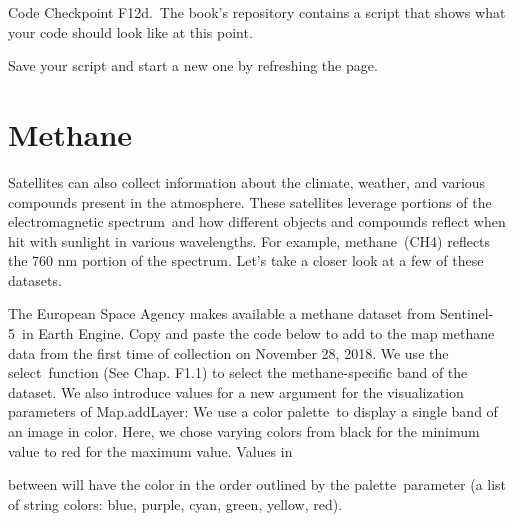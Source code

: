 \documentclass[
  letterpaper,
  DIV=11,
  numbers=noendperiod]{scrreprt}
\begin{document}
\begin{tcolorbox}[enhanced jigsaw, left=2mm, breakable, rightrule=.15mm, opacityback=0, colframe=quarto-callout-note-color-frame, colbacktitle=quarto-callout-note-color!10!white, arc=.35mm, opacitybacktitle=0.6, toptitle=1mm, colback=white, leftrule=.75mm, title=\textcolor{quarto-callout-note-color}{\faInfo}\hspace{0.5em}{Note}, toprule=.15mm, bottomtitle=1mm, titlerule=0mm, bottomrule=.15mm, coltitle=black]

Code Checkpoint F12d.~The book's repository contains a script that shows
what your code should look like at this point.

\end{tcolorbox}

Save your script and start a new one by refreshing the page.

\hypertarget{methane}{%
\section{Methane}\label{methane}}

Satellites can also collect information about the climate, weather, and
various compounds present in the atmosphere. These satellites leverage
portions of the electromagnetic spectrum~and how different objects and
compounds reflect when hit with sunlight in various wavelengths. For
example, methane~(CH4) reflects the 760 nm portion of the spectrum.
Let's take a closer look at a few of these datasets.

The European Space Agency makes available a methane dataset from
Sentinel-5~in Earth Engine. Copy and paste the code below to add to the
map methane data from the first time of collection on November 28, 2018.
We use the select~function (See Chap. F1.1) to select the
methane-specific band of the dataset. We also introduce values for a new
argument for the visualization parameters of Map.addLayer: We use a
color palette~to display a single band of an image in color. Here, we
chose varying colors from black for the minimum value to red for the
maximum value. Values in

between will have the color in the order outlined by the
palette~parameter (a list of string colors: blue, purple, cyan, green,
yellow, red).
\end{document}
